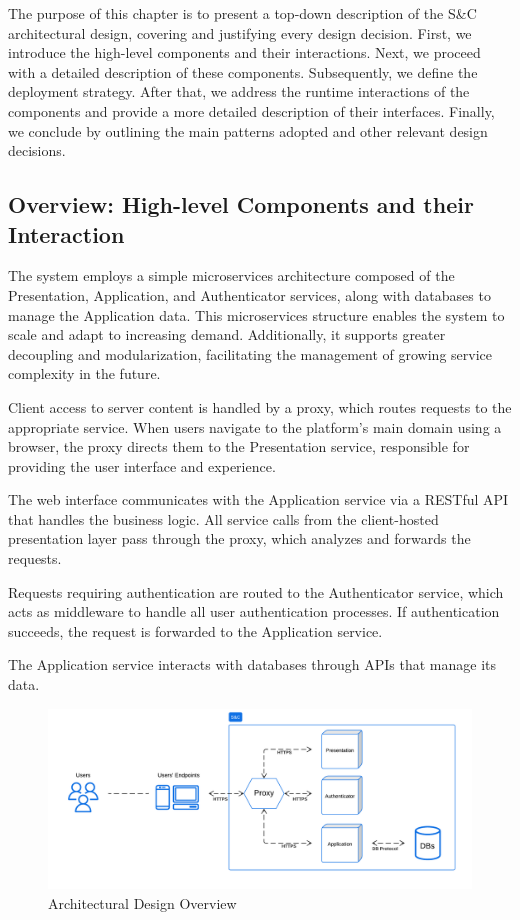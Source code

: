 The purpose of this chapter is to present a top-down description of the S\&C architectural design, covering and justifying every design decision.
First, we introduce the high-level components and their interactions.
Next, we proceed with a detailed description of these components.
Subsequently, we define the deployment strategy.
After that, we address the runtime interactions of the components and provide a more detailed description of their interfaces.
Finally, we conclude by outlining the main patterns adopted and other relevant design decisions.

\subsection{Overview: High-level Components and their Interaction}
The system employs a simple microservices architecture composed of the Presentation, Application, and Authenticator services, along with databases to manage the Application data.
This microservices structure enables the system to scale and adapt to increasing demand. Additionally, it supports greater decoupling and modularization, facilitating the management of growing service complexity in the future.

Client access to server content is handled by a proxy, which routes requests to the appropriate service.
When users navigate to the platform's main domain using a browser, the proxy directs them to the Presentation service, responsible for providing the user interface and experience.

The web interface communicates with the Application service via a RESTful API that handles the business logic.
All service calls from the client-hosted presentation layer pass through the proxy, which analyzes and forwards the requests.

Requests requiring authentication are routed to the Authenticator service, which acts as middleware to handle all user authentication processes.
If authentication succeeds, the request is forwarded to the Application service.

The Application service interacts with databases through APIs that manage its data.
\begin{figure}[H]
    \centering
    \includegraphics[width=\linewidth]{Latex/Images/DD/Overview0.png}
    \caption{Architectural Design Overview}
    \label{fig:ASoverview}
\end{figure}
